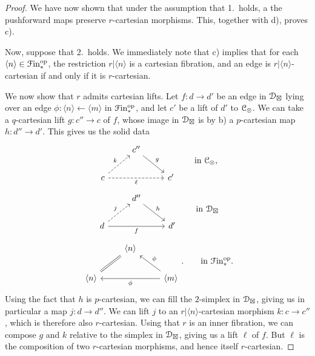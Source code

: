 \documentclass[main.tex]{subfiles}
\begin{document}
\begin{proof}
  We have now shown that under the assumption that 1.\ holds, a the pushforward maps preserve $r$-cartesian morphisms. This, together with d), proves c).

  Now, suppose that 2.\ holds. We immediately note that c) implies that for each $\langle n \rangle \in \mathcal{F}\mathrm{in}_{*}^{\mathrm{op}}$, the restriction $r|\langle n \rangle$ is a cartesian fibration, and an edge is $r|\langle n \rangle$-cartesian if and only if it is $r$-cartesian.

  We now show that $r$ admits cartesian lifts. Let $f\colon d \to d'$ be an edge in $\mathcal{D}_{\boxtimes}$ lying over an edge $\phi\colon \langle n \rangle \leftarrow \langle m \rangle$ in $\mathcal{F}\mathrm{in}_{*}^{\mathrm{op}}$, and let $c'$ be a lift of $d'$ to $\mathcal{C}_{\otimes}$. We can take a $q$-cartesian lift $g\colon c'' \to c$ of $f$, whose image in $\mathcal{D}_{\boxtimes}$ is by b) a $p$-cartesian map $h\colon d'' \to d'$. This gives us the solid data
  \begin{equation*}
    \begin{tikzcd}
      & c''
      \arrow[dr, "g"]
      \\
      c
      \arrow[ur, dashed, "k"]
      \arrow[rr, dashed, swap, "\ell"]
      && c'
    \end{tikzcd}
    \qquad\text{in }\category{C}_{\otimes},
  \end{equation*}
  \begin{equation*}
    \begin{tikzcd}
      & d''
      \arrow[dr, "h"]
      \\
      d
      \arrow[ur, dashed, "j"]
      \arrow[rr, swap, "f"]
      && d'
    \end{tikzcd}
    \qquad\text{in }\category{D}_{\boxtimes}
  \end{equation*}
  \begin{equation*}
    \begin{tikzcd}
      & \langle n \rangle
      \arrow[dl, equals]
      \\
      \langle n \rangle
      && \langle m \rangle
      \arrow[ul, swap, "\phi"]
      \arrow[ll, "\phi"]
    \end{tikzcd}.
    \qquad\text{in }\Finp\op.
  \end{equation*}
  Using the fact that $h$ is $p$-cartesian, we can fill the $2$-simplex in $\mathcal{D}_{\boxtimes}$, giving us in particular a map $j\colon d \to d''$. We can lift $j$ to an $r|\langle n \rangle$-cartesian morphism $k\colon c \to c''$, which is therefore also $r$-cartesian. Using that $r$ is an inner fibration, we can compose $g$ and $k$ relative to the simplex in $\mathcal{D}_{\boxtimes}$, giving us a lift $\ell$ of $f$. But $\ell$ is the composition of two $r$-cartesian morphisms, and hence itself $r$-cartesian.
\end{proof}
\end{document}
